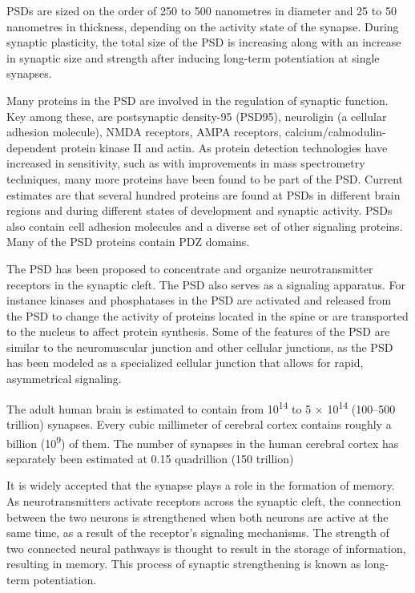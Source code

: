\documentclass[]{book}
\begin{document}
PSDs are sized on the order of 250 to 500 nanometres in diameter and 25 to 50 nanometres in thickness, depending on the activity state of the synapse. During synaptic plasticity, the total size of the PSD is increasing along with an increase in synaptic size and strength after inducing long-term potentiation at single synapses.

Many proteins in the PSD are involved in the regulation of synaptic function. Key among these, are postsynaptic density-95 (PSD95), neuroligin (a cellular adhesion molecule), NMDA receptors, AMPA receptors, calcium/calmodulin-dependent protein kinase II and actin. As protein detection technologies have increased in sensitivity, such as with improvements in mass spectrometry techniques, many more proteins have been found to be part of the PSD. Current estimates are that several hundred proteins are found at PSDs in different brain regions and during different states of development and synaptic activity. PSDs also contain cell adhesion molecules and a diverse set of other signaling proteins. Many of the PSD proteins contain PDZ domains.

The PSD has been proposed to concentrate and organize neurotransmitter receptors in the synaptic cleft. The PSD also serves as a signaling apparatus. For instance kinases and phosphatases in the PSD are activated and released from the PSD to change the activity of proteins located in the spine or are transported to the nucleus to affect protein synthesis. Some of the features of the PSD are similar to the neuromuscular junction and other cellular junctions, as the PSD has been modeled as a specialized cellular junction that allows for rapid, asymmetrical signaling.

The adult human brain is estimated to contain from 10\textsuperscript{14} to 5 × 10\textsuperscript{14} (100--500 trillion) synapses. Every cubic millimeter of cerebral cortex contains roughly a billion (10\textsuperscript{9}) of them. The number of synapses in the human cerebral cortex has separately been estimated at 0.15 quadrillion (150 trillion)

It is widely accepted that the synapse plays a role in the formation of memory. As neurotransmitters activate receptors across the synaptic cleft, the connection between the two neurons is strengthened when both neurons are active at the same time, as a result of the receptor's signaling mechanisms. The strength of two connected neural pathways is thought to result in the storage of information, resulting in memory. This process of synaptic strengthening is known as long-term potentiation.
\end{document}
